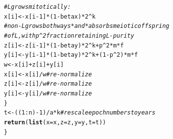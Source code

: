 \documentclass{article}\usepackage[]{graphicx}\usepackage[]{color}
\makeatletter
\newcommand{\hlnum}[1]{\textcolor[rgb]{0.686,0.059,0.569}{#1}}%
\newcommand{\hlcom}[1]{\textcolor[rgb]{0.678,0.584,0.686}{\textit{#1}}}%
\newcommand{\hlopt}[1]{\textcolor[rgb]{0,0,0}{#1}}%
\newcommand{\hlstd}[1]{\textcolor[rgb]{0.345,0.345,0.345}{#1}}%
\newcommand{\hlkwb}[1]{\textcolor[rgb]{0.69,0.353,0.396}{#1}}%
\newcommand{\hlkwc}[1]{\textcolor[rgb]{0.333,0.667,0.333}{#1}}%
\newcommand{\hlkwd}[1]{\textcolor[rgb]{0.737,0.353,0.396}{\textbf{#1}}}%
\newenvironment{kframe}{%
 \def\at@end@of@kframe{}%
 \ifinner\ifhmode%
  \def\at@end@of@kframe{\end{minipage}}%
  \begin{minipage}{\columnwidth}%
 \fi\fi%
 \def\FrameCommand##1{\hskip\@totalleftmargin \hskip-\fboxsep
 \colorbox{shadecolor}{##1}\hskip-\fboxsep
     \hskip-\linewidth \hskip-\@totalleftmargin \hskip\columnwidth}%
 \MakeFramed {\advance\hsize-\width
   \@totalleftmargin\z@ \linewidth\hsize
   \@setminipage}}%
 {\par\unskip\endMakeFramed%
 \at@end@of@kframe}
\newenvironment{knitrout}{}{} %
\makeatother
\begin{document}
\begin{knitrout}
\begin{kframe}
\begin{alltt}
    \hlcom{# L grows mitotically:}
    \hlstd{x[i]}  \hlkwb{<-}  \hlstd{x[i}\hlopt{-}\hlnum{1}\hlstd{]}\hlopt{*}\hlstd{(}\hlnum{1}\hlopt{-}\hlstd{betax)}\hlopt{*}\hlnum{2}\hlopt{^}\hlstd{k}
    \hlcom{# non-L grows both ways *and* absorbs meiotic offspring }
    \hlcom{# of L, with p^2 fraction retaining L-purity}
    \hlstd{z[i]}  \hlkwb{<-} \hlstd{z[i}\hlopt{-}\hlnum{1}\hlstd{]}\hlopt{*}\hlstd{(}\hlnum{1}\hlopt{-}\hlstd{betay)}\hlopt{*}\hlnum{2}\hlopt{^}\hlstd{k} \hlopt{+}    \hlstd{p}\hlopt{^}\hlnum{2}  \hlopt{*} \hlstd{m} \hlopt{*} \hlstd{f}
    \hlstd{y[i]}  \hlkwb{<-} \hlstd{y[i}\hlopt{-}\hlnum{1}\hlstd{]}\hlopt{*}\hlstd{(}\hlnum{1}\hlopt{-}\hlstd{betay)}\hlopt{*}\hlnum{2}\hlopt{^}\hlstd{k} \hlopt{+} \hlstd{(}\hlnum{1}\hlopt{-}\hlstd{p}\hlopt{^}\hlnum{2}\hlstd{)} \hlopt{*} \hlstd{m} \hlopt{*} \hlstd{f}
    \hlstd{w} \hlkwb{<-} \hlstd{x[i]}\hlopt{+}\hlstd{z[i]}\hlopt{+}\hlstd{y[i]}
    \hlstd{x[i]}  \hlkwb{<-}  \hlstd{x[i]}\hlopt{/}\hlstd{w}    \hlcom{# re-normalize}
    \hlstd{z[i]}  \hlkwb{<-}  \hlstd{z[i]}\hlopt{/}\hlstd{w}    \hlcom{# re-normalize}
    \hlstd{y[i]}  \hlkwb{<-}  \hlstd{y[i]}\hlopt{/}\hlstd{w}    \hlcom{# re-normalize}
  \hlstd{\}}
  \hlstd{t} \hlkwb{<-} \hlstd{((}\hlnum{1}\hlopt{:}\hlstd{n)}\hlopt{-}\hlnum{1}\hlstd{)}\hlopt{/}\hlstd{a}\hlopt{*}\hlstd{k}  \hlcom{# rescale epoch numbers to years}
  \hlkwd{return}\hlstd{(}\hlkwd{list}\hlstd{(}\hlkwc{x}\hlstd{=x,} \hlkwc{z}\hlstd{=z,} \hlkwc{y}\hlstd{=y,} \hlkwc{t}\hlstd{=t))}
\hlstd{\}}
\end{alltt}
\end{kframe}
\end{knitrout}
\end{document}
